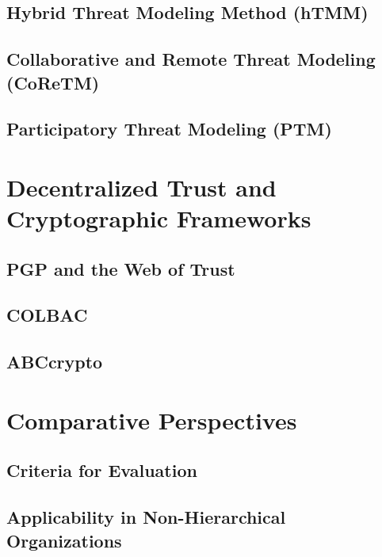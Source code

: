 \subsection{Hybrid Threat Modeling Method (hTMM)}
\label{subsec:htmm}

\subsection{Collaborative and Remote Threat Modeling (CoReTM)}
\label{subsec:coretm}

\subsection{Participatory Threat Modeling (PTM)}
\label{subsec:ptm}

\section{Decentralized Trust and Cryptographic Frameworks}
\label{sec:decentralized_cryptographic}

\subsection{PGP and the Web of Trust}
\label{subsec:pgp_web_of_trust}

\subsection{COLBAC}
\label{subsec:colbac}

\subsection{ABCcrypto}
\label{subsec:abccrypto}

\section{Comparative Perspectives}
\label{sec:comparative_perspectives}

\subsection{Criteria for Evaluation}
\label{subsec:criteria_evaluation}

\subsection{Applicability in Non-Hierarchical Organizations}
\label{subsec:applicability_non_hierarchical}
